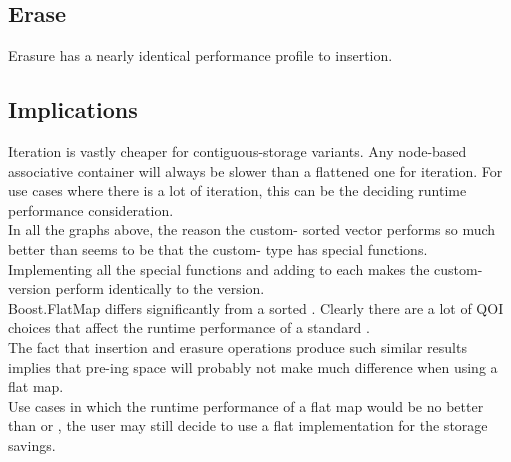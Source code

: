 \subsection{Erase}


Erasure has a nearly identical performance profile to insertion.\\


\subsection{Implications}

Iteration is vastly cheaper for contiguous-storage variants.  Any node-based
associative container will always be slower than a flattened one for
iteration.  For use cases where there is a lot of iteration, this can be the
deciding runtime performance consideration.\\

In all the graphs above, the reason the custom- sorted vector
performs so much better than  seems to be that
the custom- type has  special functions.
Implementing all the special functions and adding  to
each makes the custom- version perform identically to the
 version.\\

Boost.FlatMap differs significantly from a sorted .  Clearly
there are a lot of QOI choices that affect the runtime performance of a
standard .\\

The fact that insertion and erasure operations produce such similar results
implies that pre-ing space will probably not make much
difference when using a flat map.\\

Use cases in which the runtime performance of a flat map would be no better
than  or , the user may still decide to use a
flat implementation for the storage savings.
